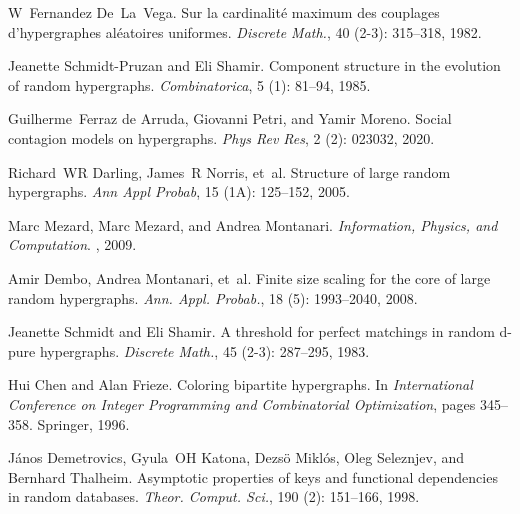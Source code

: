 W~Fernandez De~La~Vega.
\newblock Sur la cardinalit{\'e} maximum des couplages d'hypergraphes
al{\'e}atoires uniformes.
\newblock \emph{Discrete Math.}, 40 (2-3): 315--318, 1982.

Jeanette {Schmidt-Pruzan} and Eli Shamir.
\newblock Component structure in the evolution of random hypergraphs.
\newblock \emph{Combinatorica}, 5 (1): 81--94, 1985.

Guilherme~Ferraz {de Arruda}, Giovanni Petri, and Yamir Moreno.
\newblock Social contagion models on hypergraphs.
\newblock \emph{Phys Rev Res}, 2 (2): 023032, 2020.

Richard~WR Darling, James~R Norris, et~al.
\newblock Structure of large random hypergraphs.
\newblock \emph{Ann Appl Probab}, 15 (1A): 125--152, 2005.

Marc Mezard, Marc Mezard, and Andrea Montanari.
\newblock \emph{Information, Physics, and Computation}.
, 2009.

Amir Dembo, Andrea Montanari, et~al.
\newblock Finite size scaling for the core of large random hypergraphs.
\newblock \emph{Ann. Appl. Probab.}, 18 (5): 1993--2040,
2008.

Jeanette Schmidt and Eli Shamir.
\newblock A threshold for perfect matchings in random d-pure hypergraphs.
\newblock \emph{Discrete Math.}, 45 (2-3): 287--295, 1983.

Hui Chen and Alan Frieze.
\newblock Coloring bipartite hypergraphs.
\newblock In \emph{International Conference on Integer Programming and
    Combinatorial Optimization}, pages 345--358. {Springer}, 1996.

J{\'a}nos Demetrovics, Gyula~OH Katona, Dezs{\"o} Mikl{\'o}s, Oleg Seleznjev,
and Bernhard Thalheim.
\newblock Asymptotic properties of keys and functional dependencies in random
databases.
\newblock \emph{Theor. Comput. Sci.}, 190 (2): 151--166,
1998.

